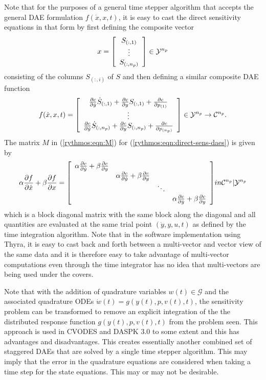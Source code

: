 \documentclass[pdf,ps2pdf,11pt]{SANDreport}
\begin{document}
Note that for the purposes of a general time stepper algorithm that accepts
the general DAE formulation $f(\dot{x},x,t)$, it is easy to cast the direct
sensitivity equations in that form by first defining the composite vector
%
\begin{equation}
x =
{\bmat{c}
S_{(:,1)} \\ \vdots \\ S_{(:,n_p)}
\emat}
\in \mathcal{Y}^{n_p}
\end{equation}
%
consisting of the columns $S_{(:,i)}$ of $S$ and then defining a similar
composite DAE function
%
\begin{equation}
f(\dot{x},x,t) =
{\bmat{c}
%
\frac{\partial c}{\partial \dot{y}} \dot{S}_{(:,1)}
+ \frac{\partial c}{\partial y} S_{(:,1)}
+ \frac{\partial c}{\partial p_{(1)}} \\
%
\vdots \\
%
\frac{\partial c}{\partial \dot{y}} \dot{S}_{(:,n_p)}
+ \frac{\partial c}{\partial y} S_{(:,n_p)}
+ \frac{\partial c}{\partial p_{(n_p)}}
%
\emat}
\in \mathcal{Y}^{n_p} \rightarrow \mathcal{C}^{n_p}.
\label{rythmos:eqn:direct-sens-daes}
\end{equation}
%
The matrix $M$ in (\ref{rythmos:eqn:M}) for
(\ref{rythmos:eqn:direct-sens-daes}) is given by
%
\begin{equation}
\alpha \frac{\partial f}{\partial \dot{x}} + \beta \frac{\partial f}{\partial x} = 
{\bmat{cccc}
\alpha \frac{\partial c}{\partial \dot{y}} + \beta \frac{\partial c}{\partial y} \\
& \alpha \frac{\partial c}{\partial \dot{y}} + \beta \frac{\partial c}{\partial y} \\
& & \ddots \\
& & & \alpha \frac{\partial c}{\partial \dot{y}} + \beta \frac{\partial c}{\partial y}
\emat}
in \mathcal{C}^{n_p}|\mathcal{Y}^{n_p}
\label{rythmos:eqn:direct-sens-daes-jac}
\end{equation}
%
which is a block diagonal matrix with the same block along the diagonal and
all quantities are evaluated at the same trial point $(\dot{y},y,u,t)$ as
defined by the time integration algorithm.  Note that in the software
implementation using Thyra, it is easy to cast back and forth between a
multi-vector and vector view of the same data and it is therefore easy to take
advantage of multi-vector computations even through the time integrator has no
idea that multi-vectors are being used under the covers.

Note that with the addition of quadrature variables $w(t)\in\mathcal{G}$ and
the associated quadrature ODEs $\dot{w}(t) = g(y(t),p,v(t),t)$, the
sensitivity problem can be transformed to remove an explicit integration of
the the distributed response function $g(y(t),p,v(t),t)$ from the problem
seen.  This approach is used in CVODES and DASPK 3.0 to some extent and this
has advantages and disadvantages.  This creates essentially another combined
set of staggered DAEs that are solved by a single time stepper algorithm.
This may imply that the error in the quadrature equations are considered when
taking a time step for the state equations.  This may or may not be desirable.
\end{document}

